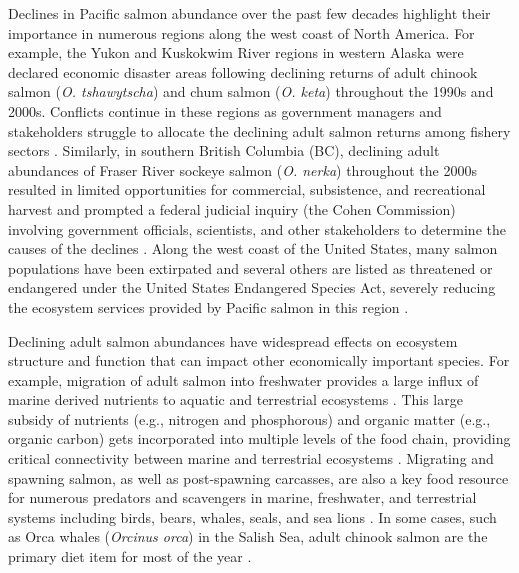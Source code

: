Declines in Pacific salmon abundance over the past few decades highlight
their importance in numerous regions along the west coast of North
America. For example, the Yukon and Kuskokwim River regions in western
Alaska were declared economic disaster areas following declining returns
of adult chinook salmon (\emph{O. tshawytscha}) and chum salmon
(\emph{O. keta}) throughout the 1990s and 2000s. Conflicts continue in
these regions as government managers and stakeholders struggle to
allocate the declining adult salmon returns among fishery sectors
\citep{Ebbin2002, Ebbin2003}. Similarly, in southern British Columbia
(BC), declining adult abundances of Fraser River sockeye salmon
(\emph{O. nerka}) throughout the 2000s resulted in limited opportunities
for commercial, subsistence, and recreational harvest and prompted a
federal judicial inquiry (the Cohen Commission) involving government
officials, scientists, and other stakeholders to determine the causes of
the declines \citep{Cohen2012}. Along the west coast of the United
States, many salmon populations have been extirpated and several others
are listed as threatened or endangered under the United States
Endangered Species Act, severely reducing the ecosystem services
provided by Pacific salmon in this region
\citep{Nehlsen1991, NMFS2015, Williams2011b}.

Declining adult salmon abundances have widespread effects on ecosystem
structure and function that can impact other economically important
species. For example, migration of adult salmon into freshwater provides
a large influx of marine derived nutrients to aquatic and terrestrial
ecosystems \citep{Claeson2006, Johnston2004, Chaloner2002}. This large
subsidy of nutrients (e.g., nitrogen and phosphorous) and organic matter
(e.g., organic carbon) gets incorporated into multiple levels of the
food chain, providing critical connectivity between marine and
terrestrial ecosystems \citep{Claeson2006, Johnston2004}. Migrating and
spawning salmon, as well as post-spawning carcasses, are also a key food
resource for numerous predators and scavengers in marine, freshwater,
and terrestrial systems including birds, bears, whales, seals, and sea
lions \citep{Ford2016, Olesiuk1993a, Trites2007a, Hilderbrand1999b}. In
some cases, such as Orca whales (\emph{Orcinus orca}) in the Salish Sea,
adult chinook salmon are the primary diet item for most of the year
\citep{Ford2016}.

